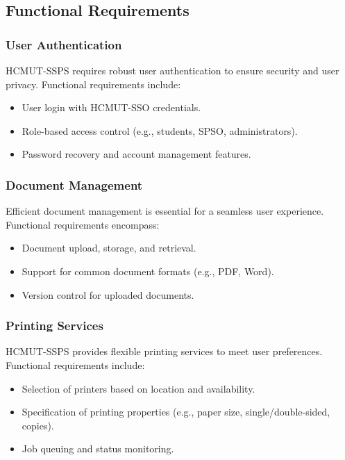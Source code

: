 \documentclass{article}
\begin{document}
\subsection{Functional Requirements}

\subsubsection{User Authentication}
HCMUT-SSPS requires robust user authentication to ensure security and user privacy. Functional requirements include:

\begin{itemize}
    \item User login with HCMUT-SSO credentials.
    \item Role-based access control (e.g., students, SPSO, administrators).
    \item Password recovery and account management features.
\end{itemize}

\subsubsection{Document Management}
Efficient document management is essential for a seamless user experience. Functional requirements encompass:

\begin{itemize}
    \item Document upload, storage, and retrieval.
    \item Support for common document formats (e.g., PDF, Word).
    \item Version control for uploaded documents.
\end{itemize}

\subsubsection{Printing Services}
HCMUT-SSPS provides flexible printing services to meet user preferences. Functional requirements include:

\begin{itemize}
    \item Selection of printers based on location and availability.
    \item Specification of printing properties (e.g., paper size, single/double-sided, copies).
    \item Job queuing and status monitoring.
\end{itemize}
\end{document}
